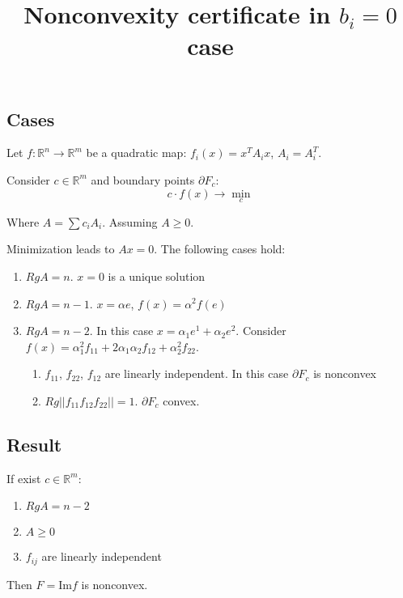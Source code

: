 \documentclass[a4paper]{article}
\date{}
\title{Nonconvexity certificate in $b_i=0$ case}
\begin{document}
\maketitle
\subsection*{Cases}

Let $f\colon \mathbb{R}^n\to\mathbb{R}^m$ be a quadratic map: $f_i(x)=x^TA_ix$, $A_i=A_i^T$.

Consider $c\in\mathbb{R}^m$ and boundary points $\partial F_c$:
$$c\cdot f(x)\to \min\limits_c$$

Where $A=\sum c_iA_i$. Assuming $A\geqslant 0$.

Minimization leads to $Ax=0$. The following cases hold:
\begin{enumerate}
\item $RgA=n$. $x=0$ is a unique solution
\item $RgA=n-1$. $x=\alpha e$, $f(x)=\alpha^2 f(e)$
\item $RgA=n-2$. In this case $x=\alpha_1 e^1+\alpha_2 e^2$. Consider $f(x)=\alpha_1^2 f_{11}+2\alpha_1\alpha_2f_{12}+\alpha_2^2f_{22}$.
\begin{enumerate}
\item $f_{11}$, $f_{22}$, $f_{12}$ are linearly independent. In this case $\partial F_c$ is nonconvex
\item $Rg ||f_{11} f_{12} f_{22}||=1$. $\partial F_c$ convex.
\end{enumerate}
\end{enumerate}


\subsection*{Result}
If exist $c\in\mathbb{R}^m$:
\begin{enumerate}
\item $RgA=n-2$
\item $A\geqslant 0$
\item $f_{ij}$ are linearly independent
\end{enumerate}
Then $F=\mbox{Im}f$ is nonconvex.
\end{document}
